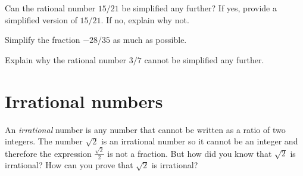 \documentclass[a4paper,oneside,12pt]{article}
\begin{document}
\begin{exercise}
Can the rational number $15 / 21$ be simplified any further?  If yes,
provide a simplified version of $15 / 21$.  If no, explain why not.
\end{exercise}


\begin{exercise}
Simplify the fraction $-28 / 35$ as much as possible.
\end{exercise}


\begin{exercise}
Explain why the rational number $3/7$ cannot be simplified any
further.
\end{exercise}




\section{Irrational numbers}

An \emph{irrational} number is any number that cannot be written as a
ratio of two integers.  The number $\sqrt{2}$ is an irrational number
so it cannot be an integer and therefore the expression
$\displaystyle{\frac{\sqrt{2}}{2}}$ is not a fraction.  But how did
you know that $\sqrt{2}$ is irrational?  How can you prove that
$\sqrt{2}$ is irrational?
\end{document}
